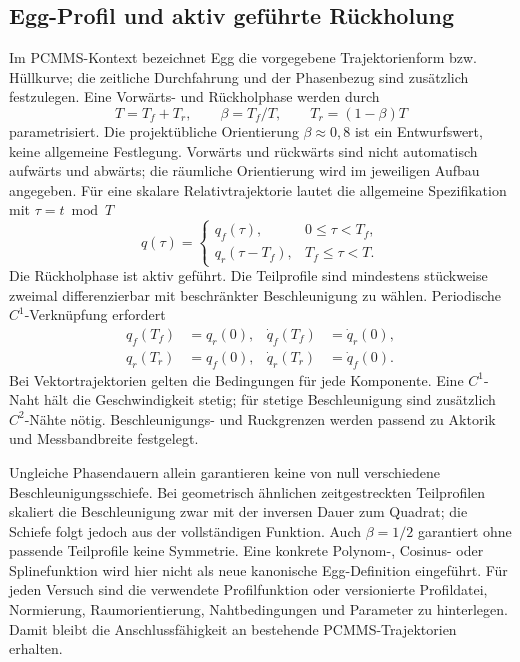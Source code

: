 \documentclass[11pt,a4paper]{article}
\begin{document}
\subsection{Egg-Profil und aktiv geführte Rückholung}
Im PCMMS-Kontext bezeichnet Egg die vorgegebene Trajektorienform bzw. Hüllkurve; die zeitliche Durchfahrung und der Phasenbezug sind zusätzlich festzulegen. Eine Vorwärts- und Rückholphase werden durch
\begin{equation}
T=T_f+T_r,\qquad \beta=T_f/T,\qquad T_r=(1-\beta)T
\end{equation}
parametrisiert. Die projektübliche Orientierung $\beta\approx0{,}8$ ist ein Entwurfswert, keine allgemeine Festlegung. Vorwärts und rückwärts sind nicht automatisch aufwärts und abwärts; die räumliche Orientierung wird im jeweiligen Aufbau angegeben.
Für eine skalare Relativtrajektorie lautet die allgemeine Spezifikation mit $\tau=t\bmod T$
\begin{equation}
q(\tau)=\begin{cases}q_f(\tau),&0\le\tau<T_f,\\q_r(\tau-T_f),&T_f\le\tau<T.\end{cases}
\end{equation}
Die Rückholphase ist aktiv geführt. Die Teilprofile sind mindestens stückweise zweimal differenzierbar mit beschränkter Beschleunigung zu wählen. Periodische $C^1$-Verknüpfung erfordert
\begin{align}
q_f(T_f)&=q_r(0),&\dot q_f(T_f)&=\dot q_r(0),\\
q_r(T_r)&=q_f(0),&\dot q_r(T_r)&=\dot q_f(0).
\end{align}
Bei Vektortrajektorien gelten die Bedingungen für jede Komponente. Eine $C^1$-Naht hält die Geschwindigkeit stetig; für stetige Beschleunigung sind zusätzlich $C^2$-Nähte nötig. Beschleunigungs- und Ruckgrenzen werden passend zu Aktorik und Messbandbreite festgelegt.

Ungleiche Phasendauern allein garantieren keine von null verschiedene Beschleunigungsschiefe. Bei geometrisch ähnlichen zeitgestreckten Teilprofilen skaliert die Beschleunigung zwar mit der inversen Dauer zum Quadrat; die Schiefe folgt jedoch aus der vollständigen Funktion. Auch $\beta=1/2$ garantiert ohne passende Teilprofile keine Symmetrie.
Eine konkrete Polynom-, Cosinus- oder Splinefunktion wird hier nicht als neue kanonische Egg-Definition eingeführt. Für jeden Versuch sind die verwendete Profilfunktion oder versionierte Profildatei, Normierung, Raumorientierung, Nahtbedingungen und Parameter zu hinterlegen. Damit bleibt die Anschlussfähigkeit an bestehende PCMMS-Trajektorien erhalten.
\end{document}

